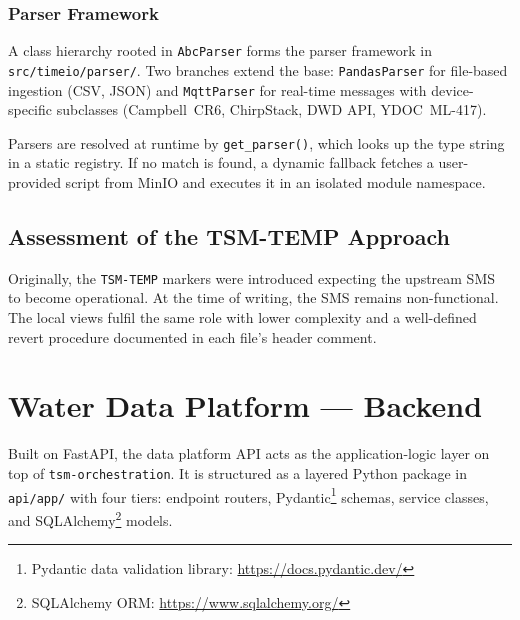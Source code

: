\subsubsection{Parser Framework}
\label{sec:impl-tsm-parsers}

A class hierarchy rooted in \texttt{AbcParser} forms the parser framework in
\texttt{src/timeio/parser/}. Two branches extend the base: \texttt{PandasParser} for
file-based ingestion (CSV, JSON) and \texttt{MqttParser} for real-time messages with
device-specific subclasses (Campbell~CR6, ChirpStack, DWD API, YDOC~ML-417).

Parsers are resolved at runtime by \texttt{get\_parser()}, which looks up the type string
in a static registry. If no match is found, a dynamic fallback fetches a user-provided
script from MinIO and executes it in an isolated module namespace.

\subsection{Assessment of the TSM-TEMP Approach}
\label{sec:impl-tsm-assessment}

Originally, the \texttt{TSM-TEMP} markers were introduced expecting the upstream SMS to become
operational. At the time of writing, the SMS remains non-functional. The local views fulfil the
same role with lower complexity and a well-defined revert procedure documented in each file's
header comment.

\section{Water Data Platform --- Backend}
\label{sec:impl-backend}


%

Built on FastAPI, the data platform API acts as the application-logic layer on top of
\texttt{tsm-orchestration}. It is structured as a layered Python package in \texttt{api/app/}
with four tiers: endpoint routers, Pydantic\footnote{Pydantic data validation library: \url{https://docs.pydantic.dev/}} schemas, service classes, and SQLAlchemy\footnote{SQLAlchemy ORM: \url{https://www.sqlalchemy.org/}} models.

